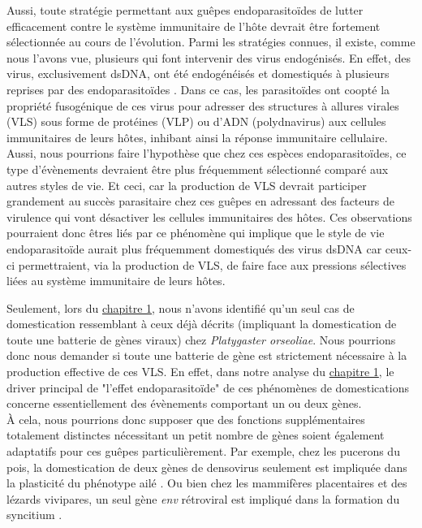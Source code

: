 Aussi, toute stratégie permettant aux guêpes endoparasitoïdes de lutter efficacement contre le système immunitaire de l'hôte devrait être fortement sélectionnée au cours de l'évolution. Parmi les stratégies connues, il existe, comme nous l'avons vue, plusieurs qui font intervenir des virus endogénisés. En effet, des virus, exclusivement dsDNA, ont été endogénéisés et domestiqués à plusieurs reprises par des endoparasitoïdes \citep{bezier_polydnaviruses_2009,volkoff_analysis_2010,pichon_recurrent_2015,burke_common_2019,di_giovanni_behavior-manipulating_2020}. Dans ce cas, les parasitoïdes ont coopté la propriété fusogénique de ces virus pour adresser des structures à allures virales (VLS) sous forme de protéines (VLP) ou d'ADN (polydnavirus) aux cellules immunitaires de leurs hôtes, inhibant ainsi la réponse immunitaire cellulaire. Aussi, nous pourrions faire l'hypothèse que chez ces espèces endoparasitoïdes, ce type d'évènements devraient être plus fréquemment sélectionné comparé aux autres styles de vie. Et ceci, car la production de VLS devrait participer grandement au succès parasitaire chez ces guêpes en adressant des facteurs de virulence qui vont désactiver les cellules immunitaires des hôtes. Ces observations pourraient donc êtres liés par ce phénomène qui implique que le style de vie endoparasitoïde aurait plus fréquemment domestiqués des virus dsDNA car ceux-ci permettraient, via la production de VLS, de faire face aux pressions sélectives liées au système immunitaire de leurs hôtes. 

Seulement, lors du \hyperref[sec:chap1]{chapitre 1}, nous n'avons identifié qu'un seul cas de domestication ressemblant à ceux déjà décrits (impliquant la domestication de toute une batterie de gènes viraux) chez \textit{Platygaster orseoliae}. Nous pourrions donc nous demander si toute une batterie de gène est strictement nécessaire à la production effective de ces VLS. En effet, dans notre analyse du \hyperref[sec:chap1]{chapitre 1}, le driver principal de "l'effet endoparasitoïde" de ces phénomènes de domestications concerne essentiellement des évènements comportant un ou deux gènes. \\

À cela, nous pourrions donc supposer que des fonctions supplémentaires totalement distinctes nécessitant un petit nombre de gènes soient également adaptatifs pour ces guêpes particulièrement. Par exemple, chez les pucerons du pois, la domestication de deux gènes de densovirus seulement est impliquée dans la plasticité du phénotype ailé \citep{parker_laterally_2019}. Ou bien chez les mammifères placentaires et des lézards vivipares, un seul gène \textit{env} rétroviral est impliqué dans la formation du syncitium \citep{lavialle_paleovirology_2013,cornelis_endogenous_2017}.\\

